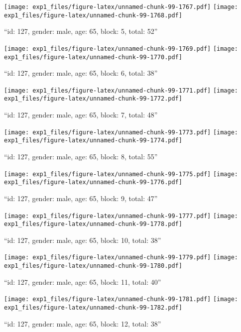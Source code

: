 \documentclass[,]{article}
\begin{document}
\texttt{[image: exp1\_files/figure-latex/unnamed-chunk-99-1767.pdf]}
\texttt{[image: exp1\_files/figure-latex/unnamed-chunk-99-1768.pdf]}

\newpage
[1] 

``id: 127, gender: male, age: 65, block: 5, total: 52''

\texttt{[image: exp1\_files/figure-latex/unnamed-chunk-99-1769.pdf]}
\texttt{[image: exp1\_files/figure-latex/unnamed-chunk-99-1770.pdf]}

\newpage
[1] 

``id: 127, gender: male, age: 65, block: 6, total: 38''

\texttt{[image: exp1\_files/figure-latex/unnamed-chunk-99-1771.pdf]}
\texttt{[image: exp1\_files/figure-latex/unnamed-chunk-99-1772.pdf]}

\newpage
[1] 

``id: 127, gender: male, age: 65, block: 7, total: 48''

\texttt{[image: exp1\_files/figure-latex/unnamed-chunk-99-1773.pdf]}
\texttt{[image: exp1\_files/figure-latex/unnamed-chunk-99-1774.pdf]}

\newpage
[1] 

``id: 127, gender: male, age: 65, block: 8, total: 55''

\texttt{[image: exp1\_files/figure-latex/unnamed-chunk-99-1775.pdf]}
\texttt{[image: exp1\_files/figure-latex/unnamed-chunk-99-1776.pdf]}

\newpage
[1] 

``id: 127, gender: male, age: 65, block: 9, total: 47''

\texttt{[image: exp1\_files/figure-latex/unnamed-chunk-99-1777.pdf]}
\texttt{[image: exp1\_files/figure-latex/unnamed-chunk-99-1778.pdf]}

\newpage
[1] 

``id: 127, gender: male, age: 65, block: 10, total: 38''

\texttt{[image: exp1\_files/figure-latex/unnamed-chunk-99-1779.pdf]}
\texttt{[image: exp1\_files/figure-latex/unnamed-chunk-99-1780.pdf]}

\newpage
[1] 

``id: 127, gender: male, age: 65, block: 11, total: 40''

\texttt{[image: exp1\_files/figure-latex/unnamed-chunk-99-1781.pdf]}
\texttt{[image: exp1\_files/figure-latex/unnamed-chunk-99-1782.pdf]}

\newpage
[1] 

``id: 127, gender: male, age: 65, block: 12, total: 38''
\end{document}
